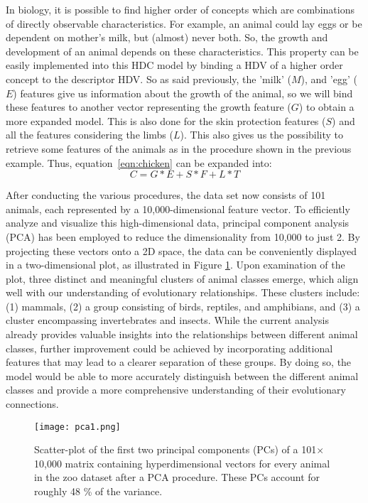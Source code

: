 In biology, it is possible to find higher order of concepts which are combinations of directly observable characteristics. For example, an animal could lay eggs or be dependent on mother's milk, but (almost) never both. So, the growth and development of an animal depends on these characteristics. This property can be easily implemented into this HDC model by binding a HDV of a higher order concept to the descriptor HDV. So as said previously, the 'milk' ($M$), and 'egg' ($E$) features give us information about the growth of the animal, so we will bind these features to another vector representing the growth feature ($G$) to obtain a more expanded model. This is also done for the skin protection features ($S$) and all the features considering the limbs ($L$). This also gives us the possibility to retrieve some features of the animals as in the procedure shown in the previous example. Thus, equation~\ref{eqn:chicken} can be expanded into:
\begin{equation}
    C = G*E + S*F + L*T
\end{equation}

After conducting the various procedures, the data set now consists of 101 animals, each represented by a 10,000-dimensional feature vector. To efficiently analyze and visualize this high-dimensional data, principal component analysis (PCA) has been employed to reduce the dimensionality from 10,000 to just 2. By projecting these vectors onto a 2D space, the data can be conveniently displayed in a two-dimensional plot, as illustrated in Figure \ref{fig:exm2}. Upon examination of the plot, three distinct and meaningful clusters of animal classes emerge, which align well with our understanding of evolutionary relationships. These clusters include: (1) mammals, (2) a group consisting of birds, reptiles, and amphibians, and (3) a cluster encompassing invertebrates and insects. While the current analysis already provides valuable insights into the relationships between different animal classes, further improvement could be achieved by incorporating additional features that may lead to a clearer separation of these groups. By doing so, the model would be able to more accurately distinguish between the different animal classes and provide a more comprehensive understanding of their evolutionary connections.
\begin{figure}[h]
    \centering
    \texttt{[image: pca1.png]}
    \caption{Scatter-plot of the first two principal components (PCs) of a 101$\times$10,000 matrix containing hyperdimensional vectors for every animal in the zoo dataset after a PCA procedure. These PCs account for roughly 48 \% of the variance.}
    \label{fig:exm2}
\end{figure}


